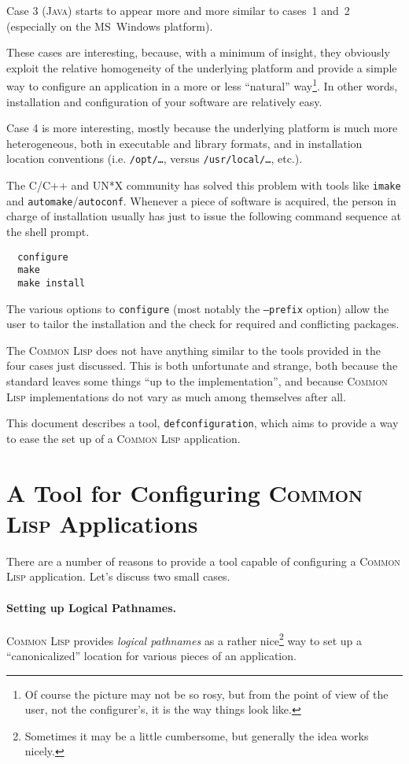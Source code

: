 \documentclass{article}
\newcommand{\CL}{\textsc{Common Lisp}}
\newcommand{\Java}{\textsc{Java}}
\newcommand{\defconfiguration}{\texttt{defconfiguration}}
\newcommand{\code}[1]{\texttt{#1}}
\begin{document}
Case 3 (\Java{}) starts to appear more and more similar to cases~1
and~2 (especially on the MS~Windows platform).

These cases are interesting, because, with a minimum of insight, they
obviously exploit the relative homogeneity of the underlying platform
and provide a simple way to configure an application in a more or
less ``natural'' way\footnote{Of course the picture may not be so
rosy, but from the point of view of the user, not the configurer's, it
is the way things look like.}. In other words, installation and
configuration of your software are relatively easy.

Case 4 is more interesting, mostly because the underlying platform is
much more heterogeneous, both in executable and library formats, and
in installation location conventions (i.e. \texttt{/opt/\ldots},
versus \texttt{/usr/local/\ldots}, etc.).

The C/C++ and UN*X community has solved this problem with tools like
\texttt{imake} and \texttt{automake}/\texttt{autoconf}.  Whenever a
piece of software is acquired, the person in charge of installation
usually has just to issue the following command sequence at the shell
prompt.
\begin{verbatim}
  configure
  make
  make install
\end{verbatim}
The various options to \code{configure} (most notably the
\code{--prefix} option) allow the user to tailor the installation and
the check for required and conflicting packages.

The \CL{} does not have anything similar to the tools provided in the
four cases just discussed.  This is both unfortunate and strange, both
because the standard leaves some things ``up to the implementation'',
and because \CL{} implementations do not vary as much among themselves
after all.

This document describes a tool, \defconfiguration{}, which aims to
provide a way to ease the set up of a \CL{} application.


\section{A Tool for Configuring \CL{} Applications}

There are a number of reasons to provide a tool capable of configuring
a \CL{} application. Let's discuss two small cases.

\paragraph{Setting up Logical Pathnames.} \CL{} provides \emph{logical
pathnames} \cite{pitman96:_common_lisp_hyper} as a rather
nice\footnote{Sometimes it may be a little cumbersome, but generally
the idea works nicely.}  way to set up a ``canonicalized'' location
for various pieces of an application.
\end{document}
